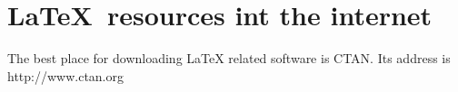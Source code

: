 \documentclass{article}
\begin{document}
	\section{\sffamily\LaTeX\ resources int the internet}
	The best place for downloading LaTeX related software is CTAN.
	Its address is \ttfamily http://www.ctan.org\rmfamily
\end{document}
